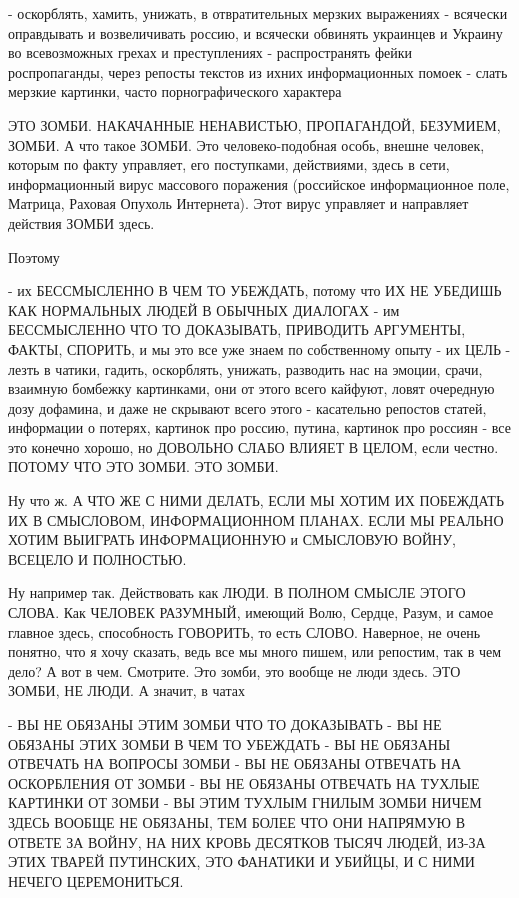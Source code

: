 - оскорблять, хамить, унижать, в отвратительных мерзких выражениях
- всячески оправдывать и возвеличивать россию, и всячески обвинять украинцев и Украину во всевозможных грехах и преступлениях
- распространять фейки роспропаганды, через репосты текстов из ихних информационных помоек
- слать мерзкие картинки, часто порнографического характера 

ЭТО ЗОМБИ. НАКАЧАННЫЕ НЕНАВИСТЬЮ, ПРОПАГАНДОЙ, БЕЗУМИЕМ, ЗОМБИ. А что такое
ЗОМБИ. Это человеко-подобная особь, внешне человек, которым по факту управляет,
его поступками, действиями, здесь в сети, информационный вирус массового
поражения (российское информационное поле, Матрица, Раховая Опухоль Интернета).
Этот вирус управляет и направляет действия ЗОМБИ здесь. 

Поэтому

- их БЕССМЫСЛЕННО В ЧЕМ ТО УБЕЖДАТЬ, потому что ИХ НЕ УБЕДИШЬ КАК НОРМАЛЬНЫХ ЛЮДЕЙ В ОБЫЧНЫХ ДИАЛОГАХ
- им БЕССМЫСЛЕННО ЧТО ТО ДОКАЗЫВАТЬ, ПРИВОДИТЬ АРГУМЕНТЫ, ФАКТЫ, СПОРИТЬ, и мы это все уже знаем по собственному опыту
- их ЦЕЛЬ - лезть в чатики, гадить, оскорблять, унижать, разводить нас на эмоции, срачи, взаимную бомбежку картинками, они от этого всего кайфуют, ловят очередную дозу дофамина, и даже не скрывают всего этого
- касательно репостов статей, информации о потерях, картинок про россию, путина, картинок про россиян - все это конечно хорошо, но ДОВОЛЬНО СЛАБО ВЛИЯЕТ В ЦЕЛОМ, если честно. ПОТОМУ ЧТО ЭТО ЗОМБИ. ЭТО ЗОМБИ.

Ну что ж. А ЧТО ЖЕ С НИМИ ДЕЛАТЬ, ЕСЛИ МЫ ХОТИМ ИХ ПОБЕЖДАТЬ
ИХ В СМЫСЛОВОМ, ИНФОРМАЦИОННОМ ПЛАНАХ. ЕСЛИ МЫ РЕАЛЬНО ХОТИМ ВЫИГРАТЬ ИНФОРМАЦИОННУЮ и СМЫСЛОВУЮ ВОЙНУ, ВСЕЦЕЛО И ПОЛНОСТЬЮ.

Ну например так. Действовать как ЛЮДИ. В ПОЛНОМ СМЫСЛЕ ЭТОГО СЛОВА. Как ЧЕЛОВЕК РАЗУМНЫЙ, имеющий Волю, Сердце, Разум, и самое главное здесь, способность ГОВОРИТЬ, то есть СЛОВО. Наверное, не очень понятно, что я хочу сказать, ведь все мы много пишем, или репостим, так в чем дело? А вот в чем. Смотрите. Это зомби, это вообще не люди здесь. ЭТО ЗОМБИ, НЕ ЛЮДИ. А значит, в чатах

- ВЫ НЕ ОБЯЗАНЫ ЭТИМ ЗОМБИ ЧТО ТО ДОКАЗЫВАТЬ
- ВЫ НЕ ОБЯЗАНЫ ЭТИХ ЗОМБИ В ЧЕМ ТО УБЕЖДАТЬ
- ВЫ НЕ ОБЯЗАНЫ ОТВЕЧАТЬ НА  ВОПРОСЫ ЗОМБИ
- ВЫ НЕ ОБЯЗАНЫ ОТВЕЧАТЬ НА  ОСКОРБЛЕНИЯ ОТ ЗОМБИ
- ВЫ НЕ ОБЯЗАНЫ ОТВЕЧАТЬ НА ТУХЛЫЕ КАРТИНКИ ОТ ЗОМБИ
- ВЫ ЭТИМ ТУХЛЫМ ГНИЛЫМ ЗОМБИ НИЧЕМ ЗДЕСЬ ВООБЩЕ НЕ ОБЯЗАНЫ, ТЕМ БОЛЕЕ ЧТО ОНИ
НАПРЯМУЮ В ОТВЕТЕ ЗА ВОЙНУ, НА НИХ КРОВЬ ДЕСЯТКОВ ТЫСЯЧ ЛЮДЕЙ, ИЗ-ЗА ЭТИХ
ТВАРЕЙ ПУТИНСКИХ, ЭТО ФАНАТИКИ И УБИЙЦЫ, И С НИМИ НЕЧЕГО ЦЕРЕМОНИТЬСЯ.

